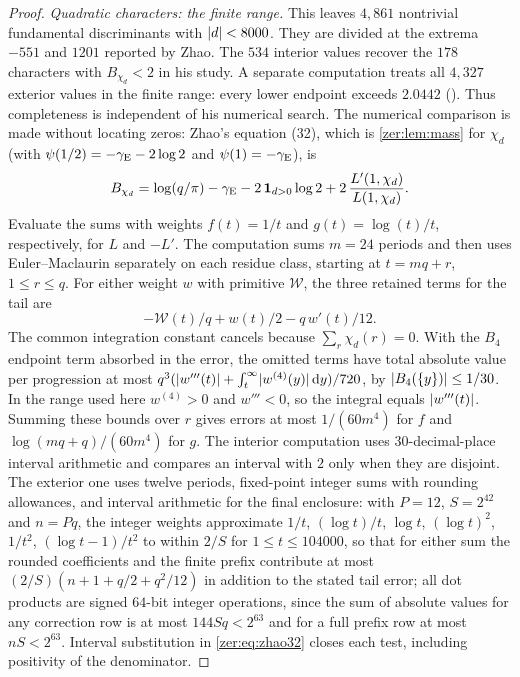 \begin{proof}
\emph{Quadratic characters: the finite range.} This leaves $4{,}861$ nontrivial
fundamental discriminants with $\lvert d\rvert<8000$. They are divided at the extrema $-551$ and
$1201$ reported by Zhao. The $534$ interior values recover the $178$ characters with
$B_{\chi_d}<2$ in his study. A separate computation treats all $4{,}327$ exterior values
in the finite range: every lower endpoint exceeds $2.0442$
(). Thus completeness is independent
of his numerical search. The numerical comparison is made without locating zeros: Zhao's
equation (32), which is \cref{zer:lem:mass} for $\chi_d$ (with $\psi(1/2)=-\gamma_{\mathrm{E}}-2\log2$ and
$\psi(1)=-\gamma_{\mathrm{E}}$), is
\begin{equation}\label{zer:eq:zhao32}
 B_{\chi_d}=\log(q/\pi)-\gamma_{\mathrm{E}}-2\,\mathbf 1_{d>0}\log2+2\,\frac{L'(1,\chi_d)}{L(1,\chi_d)} .
\end{equation}
Evaluate the sums with weights $f(t)=1/t$ and $g(t)=\log(t)/t$, respectively, for $L$ and
$-L'$. The computation sums $m=24$ periods and then uses Euler--Maclaurin separately on
each residue class, starting at $t=mq+r$, $1\le r\le q$. For either weight $w$ with
primitive $\mathcal W$, the three retained terms for the tail are
\[
 -\mathcal W(t)/q+w(t)/2-q\,w'(t)/12 .
\]
The common integration constant cancels because $\sum_r\chi_d(r)=0$. With the $B_4$
endpoint term absorbed in the error, the omitted terms have total absolute value per
progression at most $q^3(\lvert w'''(t)\rvert+\int_t^\infty\lvert w^{(4)}(y)\rvert\,\mathrm{d} y)/720$, by
$\lvert B_4(\{y\})\rvert\le1/30$. In the range used here $w^{(4)}>0$ and $w'''<0$, so the
integral equals $\lvert w'''(t)\rvert$. Summing these bounds over $r$ gives errors at most
$1/(60m^4)$ for $f$ and $\log(mq+q)/(60m^4)$ for $g$. The interior computation uses
$30$-decimal-place interval arithmetic and compares an interval with $2$ only when they are
disjoint. The exterior one uses twelve periods, fixed-point integer sums with rounding
allowances, and interval arithmetic for the final enclosure: with $P=12$, $S=2^{42}$ and
$n=Pq$, the integer weights approximate
$1/t$, $(\log t)/t$, $\log t$, $(\log t)^2$, $1/t^2$, $(\log t-1)/t^2$ to within $2/S$ for
$1\le t\le104000$, so that for either sum the rounded coefficients and the finite prefix
contribute at most $(2/S)(n+1+q/2+q^2/12)$ in addition to the stated tail error; all dot
products are signed $64$-bit integer operations, since the sum of absolute values for any
correction row is at most $144Sq<2^{63}$ and for a full prefix row at most $nS<2^{63}$.
Interval substitution in \eqref{zer:eq:zhao32} closes each test, including positivity of
the denominator.


\end{proof}
